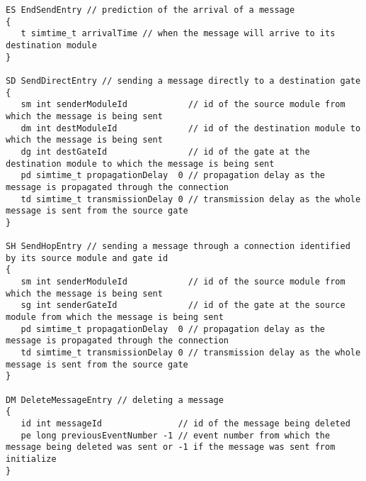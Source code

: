 \begin{verbatim}
ES EndSendEntry // prediction of the arrival of a message
{
   t simtime_t arrivalTime // when the message will arrive to its destination module
}

SD SendDirectEntry // sending a message directly to a destination gate
{
   sm int senderModuleId            // id of the source module from which the message is being sent
   dm int destModuleId              // id of the destination module to which the message is being sent
   dg int destGateId                // id of the gate at the destination module to which the message is being sent
   pd simtime_t propagationDelay  0 // propagation delay as the message is propagated through the connection
   td simtime_t transmissionDelay 0 // transmission delay as the whole message is sent from the source gate
}

SH SendHopEntry // sending a message through a connection identified by its source module and gate id
{
   sm int senderModuleId            // id of the source module from which the message is being sent
   sg int senderGateId              // id of the gate at the source module from which the message is being sent
   pd simtime_t propagationDelay  0 // propagation delay as the message is propagated through the connection
   td simtime_t transmissionDelay 0 // transmission delay as the whole message is sent from the source gate
}

DM DeleteMessageEntry // deleting a message
{
   id int messageId               // id of the message being deleted
   pe long previousEventNumber -1 // event number from which the message being deleted was sent or -1 if the message was sent from initialize
}
\end{verbatim}

